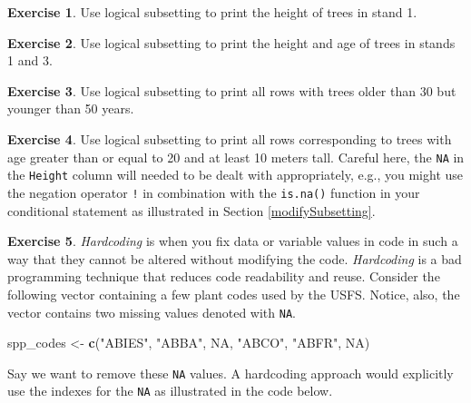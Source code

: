 \documentclass[
  11pt,
]{krantz}
\newenvironment{Shaded}{\begin{snugshade}}{\end{snugshade}}
\newcommand{\KeywordTok}[1]{\textcolor[rgb]{0.13,0.29,0.53}{\textbf{#1}}}
\newcommand{\NormalTok}[1]{#1}
\newcommand{\OtherTok}[1]{\textcolor[rgb]{0.56,0.35,0.01}{#1}}
\newcommand{\StringTok}[1]{\textcolor[rgb]{0.31,0.60,0.02}{#1}}
\theoremstyle{definition}
\theoremstyle{definition}
\theoremstyle{definition}
\newtheorem{exercise}{Exercise}[chapter]
\theoremstyle{definition}
\theoremstyle{remark}
\begin{document}
\begin{exercise}
\protect\hypertarget{exr:data6}{}\label{exr:data6}Use logical subsetting to print the height of trees in stand 1.
\end{exercise}

\begin{exercise}
\protect\hypertarget{exr:data7}{}\label{exr:data7}Use logical subsetting to print the height and age of trees in stands 1 and 3.
\end{exercise}

\begin{exercise}
\protect\hypertarget{exr:data8}{}\label{exr:data8}Use logical subsetting to print all rows with trees older than 30 but younger than 50 years.
\end{exercise}

\begin{exercise}
\protect\hypertarget{exr:data9}{}\label{exr:data9}Use logical subsetting to print all rows corresponding to trees with age greater than or equal to 20 and at least 10 meters tall. Careful here, the \texttt{NA} in the \texttt{Height} column will needed to be dealt with appropriately, e.g., you might use the negation operator \texttt{!} in combination with the \texttt{is.na()} function in your conditional statement as illustrated in Section \ref{modifySubsetting}.
\end{exercise}

\begin{exercise}
\protect\hypertarget{exr:data10}{}\label{exr:data10}\emph{Hardcoding} is when you fix data or variable values in code in such a way that they cannot be altered without modifying the code. \emph{Hardcoding} is a bad programming technique that reduces code readability and reuse. Consider the following vector containing a few plant codes used by the USFS. Notice, also, the vector contains two missing values denoted with \texttt{NA}.
\end{exercise}

\begin{Shaded}
\begin{Highlighting}[]
\NormalTok{spp\_codes \textless{}{-}}\StringTok{ }\KeywordTok{c}\NormalTok{(}\StringTok{"ABIES"}\NormalTok{, }\StringTok{"ABBA"}\NormalTok{, }\OtherTok{NA}\NormalTok{, }\StringTok{"ABCO"}\NormalTok{, }\StringTok{"ABFR"}\NormalTok{, }\OtherTok{NA}\NormalTok{)}
\end{Highlighting}
\end{Shaded}

Say we want to remove these \texttt{NA} values. A hardcoding approach would explicitly use the indexes for the \texttt{NA} as illustrated in the code below.
\end{document}
